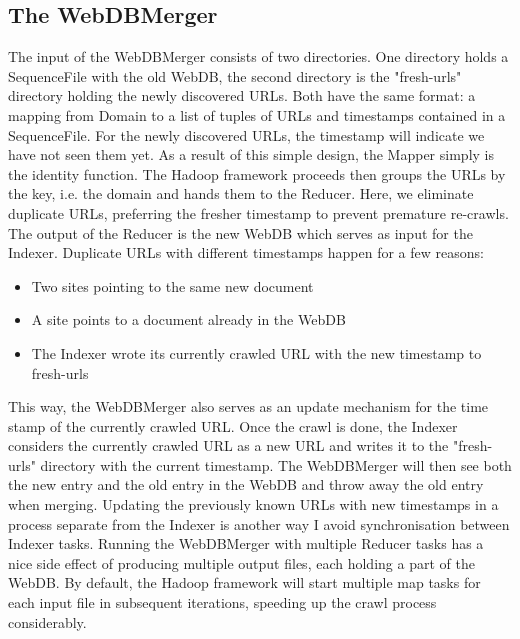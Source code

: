 \documentclass[10pt,a4paper]{report}
\begin{document}
\subsection*{The WebDBMerger}
The input of the WebDBMerger consists of two directories. One directory holds a SequenceFile with the old WebDB, the second directory is the "fresh-urls" directory holding the newly
discovered URLs. Both have the same format: a mapping from Domain to a list of tuples of URLs and timestamps contained in a SequenceFile. For the newly discovered URLs,
the timestamp will indicate we have not seen them yet.
As a result of this simple design, the Mapper simply is the identity function. The Hadoop framework proceeds then groups the URLs by the key, i.e. the domain and hands them
to the Reducer. Here, we eliminate duplicate URLs, preferring the fresher timestamp to prevent premature re-crawls. The output of the Reducer is the new WebDB which
serves as input for the Indexer.
Duplicate URLs with different timestamps happen for a few reasons:
\begin{itemize}
\item Two sites pointing to the same new document
\item A site points to a document already in the WebDB
\item The Indexer wrote its currently crawled URL with the new timestamp to fresh-urls
\end{itemize}
This way, the WebDBMerger also serves as an update mechanism for the time stamp of the currently crawled URL. Once the crawl is done,
the Indexer considers the currently crawled URL as a new URL and writes it to the "fresh-urls" directory with the current timestamp.
The WebDBMerger will then see both the new entry and the old entry in the WebDB and throw away the old entry when merging. Updating the
previously known URLs with new timestamps in a process separate from the Indexer is another way I avoid synchronisation between Indexer tasks.
Running the WebDBMerger with multiple Reducer tasks has a nice side effect of producing multiple output files, each holding a part
of the WebDB. By default, the Hadoop framework will start multiple map tasks for each input file in subsequent iterations,
speeding up the crawl process considerably.
\end{document}

